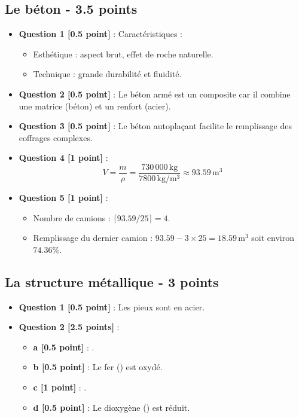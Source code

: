 \documentclass[a4paper,12pt]{article}
\begin{document}
\subsection*{Le béton - 3.5 points}
\begin{itemize}
    \item \textbf{Question 1 [0.5 point]} : Caractéristiques :
    \begin{itemize}
        \item Esthétique : aspect brut, effet de roche naturelle.
        \item Technique : grande durabilité et fluidité.
    \end{itemize}
    \item \textbf{Question 2 [0.5 point]} : Le béton armé est un composite car il combine une matrice (béton) et un renfort (acier).
    \item \textbf{Question 3 [0.5 point]} : Le béton autoplaçant facilite le remplissage des coffrages complexes.
    \item \textbf{Question 4 [1 point]} :
    \[
    V = \frac{m}{\rho} = \frac{730\,000\,\mathrm{kg}}{7800\,\mathrm{kg/m^3}} \approx 93.59\,\mathrm{m^3}
    \]
    \item \textbf{Question 5 [1 point]} :
    \begin{itemize}
        \item Nombre de camions : $\lceil 93.59 / 25 \rceil = 4$.
        \item Remplissage du dernier camion : $93.59 - 3 \times 25 = 18.59\,\mathrm{m^3}$ soit environ $74.36\%$.
    \end{itemize}
\end{itemize}

\subsection*{La structure métallique - 3 points}
\begin{itemize}
    \item \textbf{Question 1 [0.5 point]} : Les pieux sont en acier.
    \item \textbf{Question 2 [2.5 points]} :
    \begin{itemize}
        \item \textbf{a [0.5 point]} : .
        \item \textbf{b [0.5 point]} : Le fer () est oxydé.
        \item \textbf{c [1 point]} : .
        \item \textbf{d [0.5 point]} : Le dioxygène () est réduit.
    \end{itemize}
\end{itemize}
\end{document}
